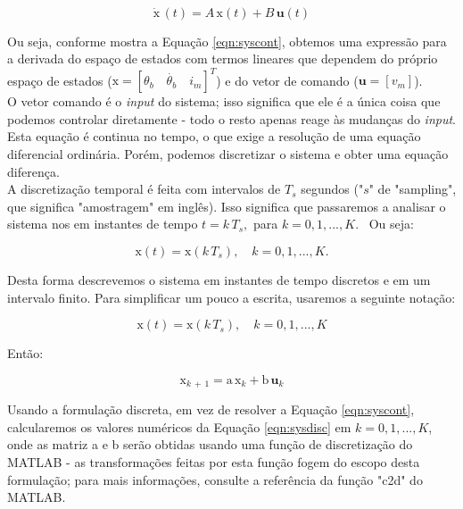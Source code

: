 \documentclass[12pt,a4paper,english,brazil]{article}
\begin{document}
\\

\begin{equation}\label{eqn:syscont}
    \pmb{\dot{\mathrm{x}}} \, (t) = A \, \pmb{\mathrm{x}} (t)  + B \, \pmb{u}(t) 
\end{equation}

Ou seja, conforme mostra a Equação \ref{eqn:syscont}, obtemos uma expressão para a derivada do espaço de estados com termos lineares que dependem do próprio espaço de estados ($\pmb{\mathrm{x}} = [\theta_b \quad \dot{\theta_b} \quad i_m]^T$) e do vetor de comando ($\pmb{u} = [v_m]$).\\

O vetor comando é o \textit{input} do sistema; isso significa que ele é a única coisa que podemos controlar diretamente - todo o resto apenas reage às mudanças do \textit{input}. Esta equação é continua no tempo, o que exige a resolução de uma equação diferencial ordinária. Porém, podemos discretizar o sistema e obter uma equação diferença.\\

A discretização temporal é feita com intervalos de $T_s$ segundos ("$s$" de "sampling", que significa "amostragem" em inglês). Isso significa que passaremos a analisar o sistema nos em instantes de tempo $t = k \, T_s,$ para $k = 0, 1, ..., K$. \ 
Ou seja:

\begin{equation}\label{eqn:discretização}
    \pmb{\mathrm{x}}(t) = \pmb{\mathrm{x}}(k \, T_s), \quad k = 0, 1, ..., K.
\end{equation}

Desta forma descrevemos o sistema em instantes de tempo discretos e em um intervalo finito. Para simplificar um pouco a escrita, usaremos a seguinte notação: 

\begin{equation}\label{eqn:notação}
    \pmb{\mathrm{x}}(t) = \pmb{\mathrm{x}}(k \, T_s), \quad k = 0, 1, ..., K
\end{equation}

Então:

\begin{equation}\label{eqn:sysdisc}
    \pmb{\mathrm{x}}_{k \, + \, 1} = \mathrm{a} \, \pmb{\mathrm{x}}_k + \mathrm{b} \, \pmb{u}_k
\end{equation}

Usando a formulação discreta, em vez de resolver a Equação \ref{eqn:syscont}, calcularemos os valores numéricos da Equação \ref{eqn:sysdisc} em $k = 0, 1, ..., K$, onde as matriz a e b serão obtidas usando uma função de discretização do MATLAB - as transformações feitas por esta função fogem do escopo desta formulação; para mais informações, consulte a referência da função "c2d" do MATLAB.
\end{document}
